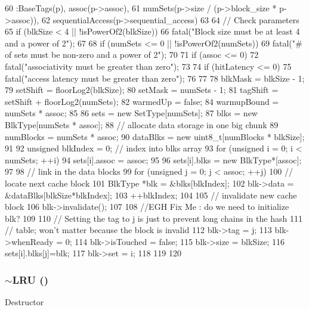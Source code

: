\begin{DoxyCode}
60     :BaseTags(p), assoc(p->assoc),
61      numSets(p->size / (p->block_size * p->assoc)),
62      sequentialAccess(p->sequential_access)
63 {
64     // Check parameters
65     if (blkSize < 4 || !isPowerOf2(blkSize)) {
66         fatal("Block size must be at least 4 and a power of 2");
67     }
68     if (numSets <= 0 || !isPowerOf2(numSets)) {
69         fatal("# of sets must be non-zero and a power of 2");
70     }
71     if (assoc <= 0) {
72         fatal("associativity must be greater than zero");
73     }
74     if (hitLatency <= 0) {
75         fatal("access latency must be greater than zero");
76     }
77 
78     blkMask = blkSize - 1;
79     setShift = floorLog2(blkSize);
80     setMask = numSets - 1;
81     tagShift = setShift + floorLog2(numSets);
82     warmedUp = false;
84     warmupBound = numSets * assoc;
85 
86     sets = new SetType[numSets];
87     blks = new BlkType[numSets * assoc];
88     // allocate data storage in one big chunk
89     numBlocks = numSets * assoc;
90     dataBlks = new uint8_t[numBlocks * blkSize];
91 
92     unsigned blkIndex = 0;       // index into blks array
93     for (unsigned i = 0; i < numSets; ++i) {
94         sets[i].assoc = assoc;
95 
96         sets[i].blks = new BlkType*[assoc];
97 
98         // link in the data blocks
99         for (unsigned j = 0; j < assoc; ++j) {
100             // locate next cache block
101             BlkType *blk = &blks[blkIndex];
102             blk->data = &dataBlks[blkSize*blkIndex];
103             ++blkIndex;
104 
105             // invalidate new cache block
106             blk->invalidate();
107 
108             //EGH Fix Me : do we need to initialize blk?
109 
110             // Setting the tag to j is just to prevent long chains in the hash
111             // table; won't matter because the block is invalid
112             blk->tag = j;
113             blk->whenReady = 0;
114             blk->isTouched = false;
115             blk->size = blkSize;
116             sets[i].blks[j]=blk;
117             blk->set = i;
118         }
119     }
120 }
\end{DoxyCode}
\hypertarget{classLRU_a611da3810a76e96c8b574845d82b6b8c}{
\subsubsection[{$\sim$LRU}]{\setlength{\rightskip}{0pt plus 5cm}$\sim${\bf LRU} ()}}
\label{classLRU_a611da3810a76e96c8b574845d82b6b8c}
Destructor 


